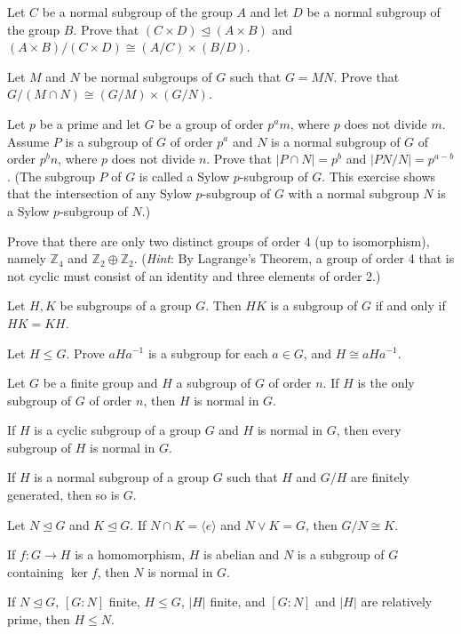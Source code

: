 \documentclass[
    11pt,a4paper,
]{exam}
\begin{document}
\begin{questions}
\question
Let $C$ be a normal subgroup of the group $A$ and let $D$ be a normal subgroup of the group $B$. Prove that $(C \times D) \unlhd (A \times B)$ and $(A \times B)/(C \times D) \cong (A/C) \times (B/D)$.




\question
Let $M$ and $N$ be normal subgroups of $G$ such that $G = MN$. Prove that $G/(M \cap N) \cong (G/M) \times (G/N)$. %




\question
Let $p$ be a prime and let $G$ be a group of order $p^a m$, where $p$ does not divide $m$. Assume $P$ is a subgroup of $G$ of order $p^a$ and $N$ is a normal subgroup of $G$ of order $p^b n$, where $p$ does not divide $n$. Prove that $|P \cap N| = p^b$ and $|P N/N| = p^{a-b}$. (The subgroup $P$ of $G$ is called a Sylow $p$-subgroup of $G$. This exercise shows that the intersection of any Sylow $p$-subgroup of $G$ with a normal subgroup $N$ is a Sylow $p$-subgroup of $N$.)



\question
Prove that there are only two distinct groups of order 4 (up to isomorphism), namely $\mathbb{Z}_4$ and $\mathbb{Z}_2 \oplus \mathbb{Z}_2$. (\textit{Hint}: By Lagrange's Theorem, a group of order 4 that is not cyclic must consist of an identity and three elements of order 2.)




\question
Let $H, K$ be subgroups of a group $G$. Then $HK$ is a subgroup of $G$ if and only if $HK = KH$.





\question
Let $H \leq  G$. Prove  $aHa^{-1}$ is a subgroup for each $a \in G$, and $H \cong aHa^{-1}$.




\question
Let $G$ be a finite group and $H$ a subgroup of $G$ of order $n$. If $H$ is the only subgroup of $G$ of order $n$, then $H$ is normal in $G$.



\question
If $H$ is a cyclic subgroup of a group $G$ and $H$ is normal in $G$, then every subgroup of $H$ is normal in $G$.%



\question
If $H$ is a normal subgroup of a group $G$ such that $H$ and $G/H$ are finitely generated, then so is $G$.



\question
Let $N \unlhd G$ and $K \unlhd G$. If $N \cap K = \langle e \rangle$ and $N \vee K = G$, then $G/N \cong K$.



\question
If $f : G \to H$ is a homomorphism, $H$ is abelian and $N$ is a subgroup of $G$ containing $\ker f$, then $N$ is normal in $G$.



\question
If $N \unlhd G$, $[G : N]$ finite, $H \leq  G$, $|H|$ finite, and $[G : N]$ and $|H|$ are relatively prime, then $H \leq N$.






\end{questions}
\end{document}
